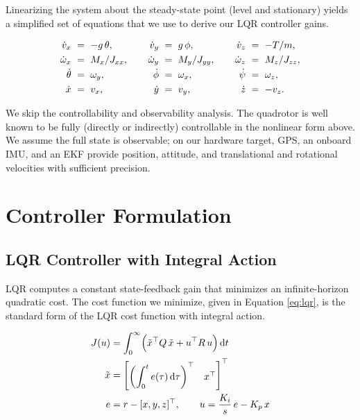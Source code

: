 \documentclass[conf]{new-aiaa}
\begin{document}
Linearizing the system about the steady-state point (level and stationary) yields a simplified set of equations that we use to derive our LQR controller gains.

\small
\begin{equation}
\label{eq:linear-eom}
\setlength{\arraycolsep}{3pt}
\begin{array}{rclcrclcrcl}
\dot v_x &=& -g\,\theta, &\quad& \dot v_y &=& g\,\phi, &\quad& \dot v_z &=& -T/m, \\[3pt]
\dot\omega_x &=& M_x/J_{xx}, && \dot\omega_y &=& M_y/J_{yy}, && \dot\omega_z &=& M_z/J_{zz}, \\[3pt]
\dot\theta &=& \omega_y, && \dot\phi &=& \omega_x, && \dot\psi &=& \omega_z, \\[3pt]
\dot x &=& v_x, && \dot y &=& v_y, && \dot z &=& -v_z.
\end{array}
\end{equation}
\normalsize

We skip the controllability and observability analysis. The quadrotor is well known to be fully (directly or indirectly) controllable in the nonlinear form above. We assume the full state is observable; on our hardware target, GPS, an onboard IMU, and an EKF provide position, attitude, and translational and rotational velocities with sufficient precision.

\section{Controller Formulation}

\subsection{LQR Controller with Integral Action}
LQR computes a constant state-feedback gain that minimizes an infinite-horizon quadratic cost. The cost function we minimize, given in Equation \ref{eq:lqr}, is the standard form of the LQR cost function with integral action.

\small
\begin{equation}
\label{eq:lqr}
\begin{aligned}
J(u) &= \int_{0}^{\infty} \Bigl( \tilde{x}^{\top} Q\, \tilde{x}
+ u^{\top} R\, u \Bigr)\,\mathrm{d}t \\
\tilde{x} &=
\begin{bmatrix}
\left(\displaystyle \int_{0}^{t} e(\tau)\,\mathrm{d}\tau\right)^{\top} & x^{\top}
\end{bmatrix}^{\top} \\
e &= r - [x, y, z]^{\top},
\qquad
u = \frac{K_i}{s}\, e - K_p\, x
\end{aligned}
\end{equation}
\normalsize
\end{document}

